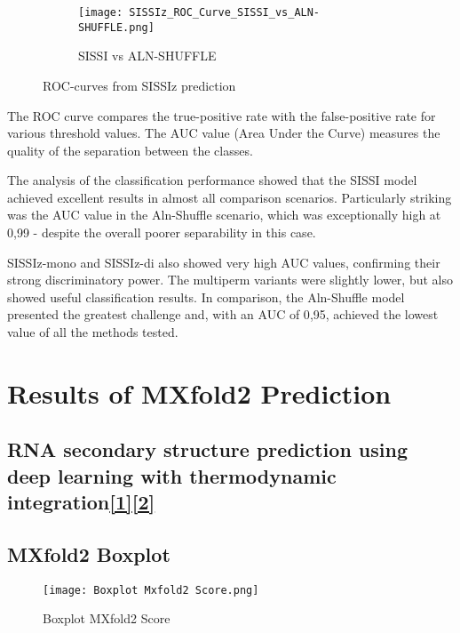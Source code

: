 \documentclass{article}
\begin{document}
\begin{large}
\begin{large}
\begin{large}
\begin{figure}[H]
    \begin{subfigure}[b]{0.48\textwidth}
        \texttt{[image: SISSIz\_ROC\_Curve\_SISSI\_vs\_ALN-SHUFFLE.png]}
        \caption{SISSI vs ALN-SHUFFLE}
    \end{subfigure}

    \caption{ROC-curves from SISSIz prediction}
\end{figure}

The ROC curve compares the true-positive rate with the false-positive rate for various threshold values. The AUC value (Area Under the Curve) measures the quality of the separation between the classes.\vspace{1em}

The analysis of the classification performance showed that the SISSI model achieved excellent results in almost all comparison scenarios. Particularly striking was the AUC value in the Aln-Shuffle scenario, which was exceptionally high at 0{,}99 - despite the overall poorer separability in this case.\vspace{1em}

SISSIz-mono and SISSIz-di also showed very high AUC values, confirming their strong discriminatory power. The multiperm variants were slightly lower, but also showed useful classification results. In comparison, the Aln-Shuffle model presented the greatest challenge and, with an AUC of 0{,}95, achieved the lowest value of all the methods tested.\vspace{1em}

\clearpage

\section{Results of MXfold2 Prediction}

\subsection{RNA secondary structure prediction using deep learning with thermodynamic integration\href{https://doi.org/10.1038/s41467-021-21194-4   }{\textbf{[1]}}\href{https://github.com/mxfold/mxfold2?tab=readme-ov-file}{\textbf{[2]}}}

\subsection{MXfold2 Boxplot}
\begin{figure}[H]
    \centering
    \texttt{[image: Boxplot Mxfold2 Score.png]}
    \caption{Boxplot MXfold2 Score}
\end{figure}


\end{large}
\end{large}
\end{large}
\end{document}
